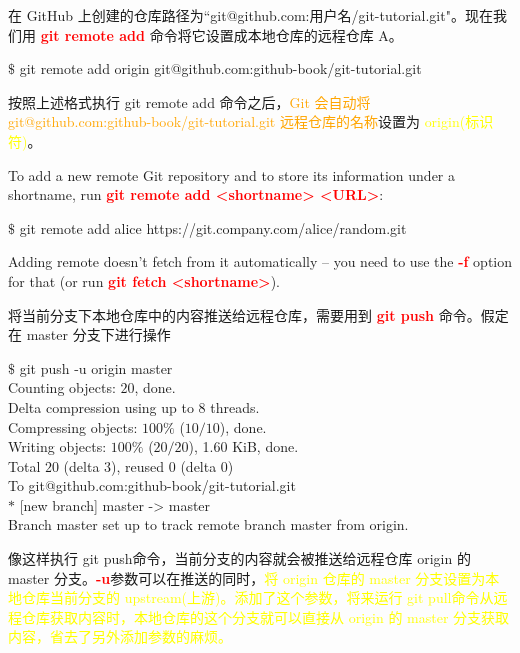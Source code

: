 \documentclass[12pt,a4paper]{article}
\begin{document}
在 GitHub 上创建的仓库路径为``git@github.com:用户名/git-tutorial.git"。现在我们用 \textcolor{red}{\bf git remote add} 命令将它设置成本地仓库的远程仓库 A。
\begin{tcolorbox}[colback=green!5,colframe=green!40!black,title= ]
$\$$ git remote add origin git@github.com:github-book/git-tutorial.git
\end{tcolorbox}
按照上述格式执行 git remote add 命令之后，\textcolor{orange}{Git 会自动将 git@github.com:github-book/git-tutorial.git 远程仓库的名称}设置为 \textcolor{yellow}{origin(标识符)}。

\cite{narębski2016mastering} To add a new remote Git repository and to store its information under a shortname, run \textcolor{red}{\bf git remote add <shortname> <URL>}:
\begin{tcolorbox}[colback=green!5,colframe=green!40!black,title= ]
$\$$ git remote add alice https://git.company.com/alice/random.git
\end{tcolorbox}
Adding remote doesn't fetch from it automatically -- you need to use the \textcolor{red}{\bf -f} option for that (or run \textcolor{red}{\bf git fetch <shortname>}).

将当前分支下本地仓库中的内容推送给远程仓库，需要用到 \textcolor{red}{\bf git push} 命令。假定在 master 分支下进行操作
\begin{tcolorbox}[colback=green!5,colframe=green!40!black,title= ]
$\$$ git push -u origin master \\
Counting objects: $20$, done. \\
Delta compression using up to 8 threads. \\
Compressing objects: $100\%$ ($10/10$), done. \\
Writing objects: $100\%$ ($20/20$), 1.60 KiB, done. \\
Total $20$ (delta $3$), reused $0$ (delta $0$) \\
To git@github.com:github-book/git-tutorial.git \\
$\ast$ [new branch] master -> master \\
Branch master set up to track remote branch master from origin.
\end{tcolorbox}
像这样执行 git push命令，当前分支的内容就会被推送给远程仓库 origin 的 master 分支。\textcolor{red}{\bf -u}参数可以在推送的同时，\textcolor{yellow}{将 origin 仓库的 master 分支设置为本地仓库当前分支的 upstream(上游)。添加了这个参数，将来运行 git pull命令从远程仓库获取内容时，本地仓库的这个分支就可以直接从 origin 的 master 分支获取内容，省去了另外添加参数的麻烦。}
\end{document}
